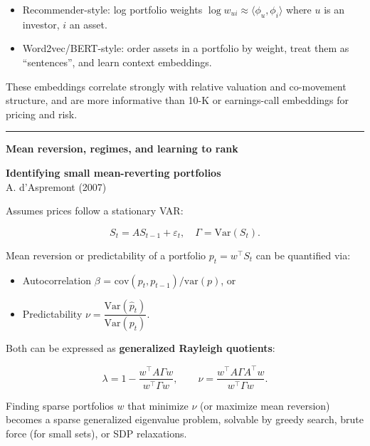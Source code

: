 \documentclass[a5paper]{article}
\providecommand{\tightlist}{%
  \setlength{\itemsep}{0pt}\setlength{\parskip}{0pt}}
\def\subsection#1{{\par\bigskip\goodbreak\large\bfseries #1\par}}
\begin{document}
\begin{itemize}
\tightlist
\item
  Recommender-style: log portfolio weights $ \log w_{ui}
  \approx \langle \phi_u,\phi_i\rangle$ where $u$ is an investor, $i$ an
  asset.
\item
  Word2vec/BERT-style: order assets in a portfolio by weight, treat them
  as ``sentences'', and learn context embeddings.
\end{itemize}

These embeddings correlate strongly with relative valuation and
co-movement structure, and are more informative than 10-K or
earnings-call embeddings for pricing and risk.

\begin{center}\rule{0.5\linewidth}{0.5pt}\end{center}

\subsection{Mean reversion, regimes, and learning to
rank}\label{mean-reversion-regimes-and-learning-to-rank}

\textbf{Identifying small mean-reverting portfolios}\\
A. d'Aspremont (2007)

Assumes prices follow a stationary VAR:

\[ S_t = A S_{t-1} + \varepsilon_t,\quad \Gamma =
\mathrm{Var}(S_t). \]

Mean reversion or predictability of a portfolio $p_t = w^\top S_t$ can be
quantified via:

\begin{itemize}
\tightlist
\item
  Autocorrelation $\beta$ = $\mathrm{cov}(p_t,p_{t-1}) / \mathrm{var}(p)$, or
\item
  Predictability $\nu =
  \dfrac{\mathrm{Var}(\hat p_t)}{\mathrm{Var}(p_t)}$.
\end{itemize}

Both can be expressed as \textbf{generalized Rayleigh quotients}:

\[ \lambda = 1 - \frac{w^\top A\Gamma w}{w^\top \Gamma w},\qquad \nu =
\frac{w^\top A\Gamma A^\top w}{w^\top \Gamma w}. \]

Finding sparse portfolios $w$ that minimize $\nu$ (or maximize mean reversion)
becomes a sparse generalized eigenvalue problem, solvable by greedy
search, brute force (for small sets), or SDP relaxations.
\end{document}
